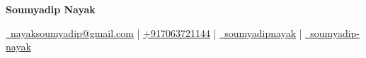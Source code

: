 \documentclass[a4paper,10pt]{article}
\begin{document}

\begin{center}

{\LARGE \textbf{Soumyadip Nayak}}

\vspace{4pt}

\href{mailto:nayaksoumyadip@gmail.com}{\faEnvelope\ nayaksoumyadip@gmail.com}
 | 
\href{tel:+917063721144}{\faPhone* +917063721144}
 | 
\href{https://github.com/soumyadipnayak}{\faGithub\ soumyadipnayak}
 | 
\href{https://www.linkedin.com/in/soumyadip-nayak/}{\faLinkedin\ soumyadip-nayak}

\end{center}

\vspace{6pt}

\end{document}
